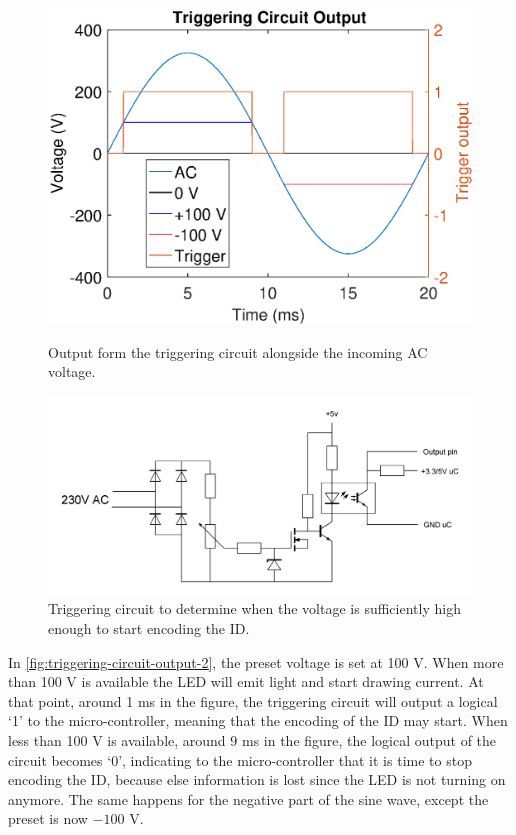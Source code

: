 	\begin{figure}[h]
		\centering
		\begin{minipage}[b]{0.49\textwidth}
			\includegraphics[width=\textwidth]{chapters/hardware-chapters/AC/ac-modulator/custom-hardware/ac-wave-triggering.eps}
			\caption{Output form the triggering circuit alongside the incoming AC voltage.}
			\label{fig:triggering-circuit-output-2}
		\end{minipage}
		\hfill
		\begin{minipage}[b]{0.49\textwidth}
			\includegraphics[width=\textwidth]{chapters/hardware-chapters/AC/ac-modulator/custom-hardware/custom-modulator-trigger.JPG}
		    \caption{Triggering circuit to determine when the voltage is sufficiently high enough to start encoding the ID.}
			\label{fig:custom-modulator-trigger}
		\end{minipage}
	\end{figure}

	In \autoref{fig:triggering-circuit-output-2}, the preset voltage is set at 100 V.
	When more than 100 V is available the LED will emit light and start drawing current.
	At that point, around 1 ms in the figure, the triggering circuit will output a logical `1' to the micro-controller, meaning that the encoding of the ID may start.
	When less than 100 V is available, around 9 ms in the figure, the logical output of the circuit becomes `0', indicating to the micro-controller that it is time to stop encoding the ID, because else information is lost since the LED is not turning on anymore.
	The same happens for the negative part of the sine wave, except the preset is now $-100$ V.


